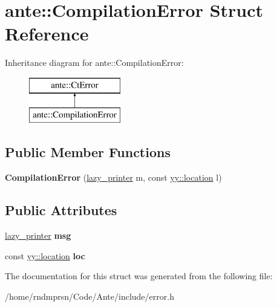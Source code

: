 \hypertarget{structante_1_1CompilationError}{}\section{ante\+:\+:Compilation\+Error Struct Reference}
\label{structante_1_1CompilationError}
Inheritance diagram for ante\+:\+:Compilation\+Error\+:\begin{figure}[H]
\begin{center}
\leavevmode
\includegraphics[height=2.000000cm]{structante_1_1CompilationError}
\end{center}
\end{figure}
\subsection*{Public Member Functions}
\begin{DoxyCompactItemize}
\item 
\mbox{\label{structante_1_1CompilationError_af8a7b79f87b981e45385876b90259328}} 
{\bfseries Compilation\+Error} (\hyperlink{structante_1_1lazy__printer}{lazy\+\_\+printer} m, const \hyperlink{classyy_1_1location}{yy\+::location} l)
\end{DoxyCompactItemize}
\subsection*{Public Attributes}
\begin{DoxyCompactItemize}
\item 
\mbox{\label{structante_1_1CompilationError_a976fe9603018841955e4638278a95f61}} 
\hyperlink{structante_1_1lazy__printer}{lazy\+\_\+printer} {\bfseries msg}
\item 
\mbox{\label{structante_1_1CompilationError_a975e12dae2532fff1c6aa225a4a1ff77}} 
const \hyperlink{classyy_1_1location}{yy\+::location} {\bfseries loc}
\end{DoxyCompactItemize}


The documentation for this struct was generated from the following file\+:\begin{DoxyCompactItemize}
\item 
/home/rndmprsn/\+Code/\+Ante/include/error.\+h\end{DoxyCompactItemize}
